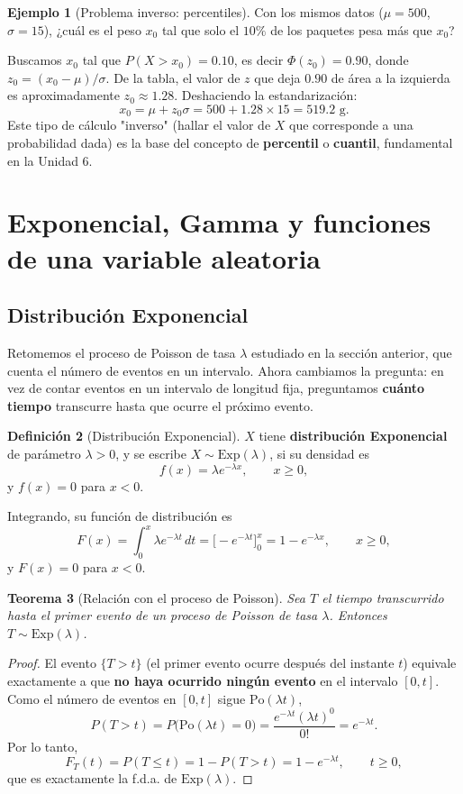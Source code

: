 \documentclass[11pt,a4paper]{article}
\theoremstyle{plain}
\newtheorem{teorema}{Teorema}[section]
\theoremstyle{definition}
\newtheorem{definicion}[teorema]{Definición}
\newtheorem{ejemplo}[teorema]{Ejemplo}
\theoremstyle{remark}
\begin{document}
\begin{ejemplo}[Problema inverso: percentiles]
Con los mismos datos ($\mu=500$, $\sigma=15$), ¿cuál es el peso $x_0$ tal que solo el $10\%$ de los paquetes pesa más que $x_0$?

Buscamos $x_0$ tal que $P(X>x_0)=0.10$, es decir $\Phi(z_0)=0.90$, donde $z_0=(x_0-\mu)/\sigma$. De la tabla, el valor de $z$ que deja $0.90$ de área a la izquierda es aproximadamente $z_0\approx1.28$. Deshaciendo la estandarización:
$$x_0=\mu+z_0\sigma=500+1.28\times15=519.2\text{ g}.$$
Este tipo de cálculo "inverso" (hallar el valor de $X$ que corresponde a una probabilidad dada) es la base del concepto de \textbf{percentil} o \textbf{cuantil}, fundamental en la Unidad 6.
\end{ejemplo}

\newpage
\section{Exponencial, Gamma y funciones de una variable aleatoria}\label{sec:exponencial}

\subsection{Distribución Exponencial}

Retomemos el proceso de Poisson de tasa $\lambda$ estudiado en la sección anterior, que cuenta el número de eventos en un intervalo. Ahora cambiamos la pregunta: en vez de contar eventos en un intervalo de longitud fija, preguntamos \textbf{cuánto tiempo} transcurre hasta que ocurre el próximo evento.

\begin{definicion}[Distribución Exponencial]
$X$ tiene \textbf{distribución Exponencial} de parámetro $\lambda>0$, y se escribe $X\sim\text{Exp}(\lambda)$, si su densidad es
$$f(x)=\lambda e^{-\lambda x},\qquad x\ge0,$$
y $f(x)=0$ para $x<0$.
\end{definicion}

Integrando, su función de distribución es
$$F(x)=\int_0^x\lambda e^{-\lambda t}\,dt=\big[-e^{-\lambda t}\big]_0^x=1-e^{-\lambda x},\qquad x\ge0,$$
y $F(x)=0$ para $x<0$.

\begin{teorema}[Relación con el proceso de Poisson]
Sea $T$ el tiempo transcurrido hasta el primer evento de un proceso de Poisson de tasa $\lambda$. Entonces $T\sim\text{Exp}(\lambda)$.
\end{teorema}
\begin{proof}
El evento $\{T>t\}$ (el primer evento ocurre después del instante $t$) equivale exactamente a que \textbf{no haya ocurrido ningún evento} en el intervalo $[0,t]$. Como el número de eventos en $[0,t]$ sigue $\text{Po}(\lambda t)$,
$$P(T>t)=P\big(\text{Po}(\lambda t)=0\big)=\frac{e^{-\lambda t}(\lambda t)^0}{0!}=e^{-\lambda t}.$$
Por lo tanto,
$$F_T(t)=P(T\le t)=1-P(T>t)=1-e^{-\lambda t},\qquad t\ge0,$$
que es exactamente la f.d.a. de $\text{Exp}(\lambda)$.
\end{proof}
\end{document}
